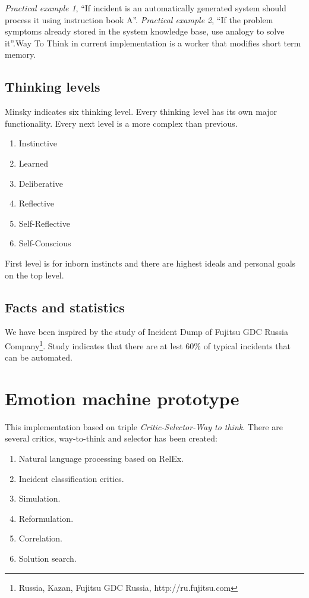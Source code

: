 \documentclass[runningheads,a4paper]{llncs}
\begin{document}
\emph{Practical example 1}, “If incident is an automatically generated system should process it using instruction book A”.
\emph{Practical example 2}, “If the problem symptoms already stored in the system knowledge base, use analogy to solve it”.Way To Think in current implementation is a worker that modifies short term memory.

\subsection{Thinking levels}

Minsky indicates six thinking level. Every thinking level has its own major functionality. Every next level is a more complex than previous.

\begin{enumerate}
 \item Instinctive
 \item Learned
 \item Deliberative
 \item Reflective
 \item Self-Reflective
 \item Self-Conscious
\end{enumerate}
First level is for inborn instincts and there are highest ideals and personal goals on the top level.

\subsection{Facts and statistics}
We have been inspired by the study of Incident Dump of Fujitsu GDC Russia  Company\footnote{Russia, Kazan, Fujitsu GDC Russia, http://ru.fujitsu.com}. Study indicates that there are at lest 60\% of typical incidents that can be automated.

\section{Emotion machine prototype}
This implementation based on triple \emph{Critic-Selector-Way to think}. There are several critics, way-to-think and selector has been created:

\begin{enumerate}
 \item Natural language processing based on RelEx.
 \item Incident classification critics.
 \item Simulation.
 \item Reformulation.
 \item Correlation.
 \item Solution search.
\end{enumerate}
\end{document}
